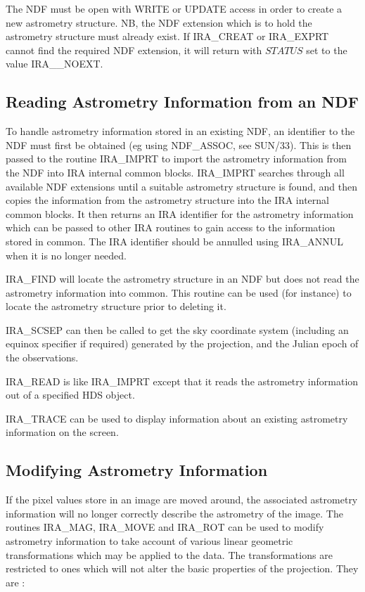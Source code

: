 The NDF must be open with WRITE or UPDATE access in order to create a new
astrometry structure. NB, the NDF extension which is to hold the astrometry
structure must already exist. If IRA\_CREAT or IRA\_EXPRT cannot find the
required NDF extension, it will return with $STATUS$ set to the value
IRA\_\_NOEXT. 

\subsection {Reading Astrometry Information from an NDF}
To handle astrometry information stored in an existing NDF, an identifier to the
NDF must first be obtained (eg using NDF\_ASSOC, see SUN/33). This is then
passed to the routine IRA\_IMPRT to import the astrometry information from the
NDF into IRA internal common blocks. IRA\_IMPRT searches through all available
NDF extensions until a suitable astrometry structure is found, and then copies
the information from the astrometry structure into the IRA internal common
blocks. It then returns an IRA identifier for the astrometry information which
can be passed to other IRA routines to gain access to the information stored in
common. The IRA identifier should be annulled using IRA\_ANNUL when it is no
longer needed. 

IRA\_FIND will locate the astrometry structure in an NDF but does not read the 
astrometry information into common. This routine can be used (for instance) to
locate the astrometry structure prior to deleting it.

IRA\_SCSEP can then be called to get the sky coordinate system (including an
equinox specifier if required) generated by the projection, and the Julian epoch
of the observations. 

IRA\_READ is like IRA\_IMPRT except that it reads the astrometry information 
out of a specified HDS object.

IRA\_TRACE can be used to display information about an existing astrometry 
information on the screen.

\subsection {Modifying Astrometry Information}
If the pixel values store in an image are moved around, the associated
astrometry information will no longer correctly describe the astrometry of the
image. The routines IRA\_MAG, IRA\_MOVE and IRA\_ROT can be used to modify
astrometry information to take account of various linear geometric
transformations which may be applied to the data. The transformations are
restricted to ones which will not alter the basic properties of the projection.
They are : 

